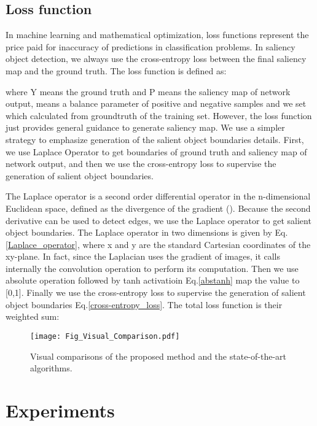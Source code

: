 \documentclass[10pt,twocolumn,letterpaper]{article}
\begin{document}
\subsection{Loss function}\label{sec:Loss function}
In machine learning and mathematical optimization, loss functions represent the price paid for inaccuracy of predictions in classification problems. In saliency object detection, we always use the cross-entropy loss between the final saliency map and the ground truth. The loss function is defined as:

where Y means the ground truth and P means the saliency map of network output,  means a balance parameter of positive and negative samples and we set  which calculated from groundtruth of the training set. However, the loss function just provides general guidance to generate saliency map. We use a simpler strategy to emphasize generation of the salient object boundaries details. First, we use Laplace Operator\cite{LO} to get boundaries of ground truth and saliency map of network output, and then we use the cross-entropy loss to supervise the generation of salient object boundaries.

 




The Laplace operator is a second order differential operator in the n-dimensional Euclidean space, defined as the divergence of the gradient (). Because the second derivative can be used to detect edges, we use the Laplace operator to get salient object boundaries. The Laplace operator in two dimensions is given by Eq.\ref{Laplace_operator}, where x and y are the standard Cartesian coordinates of the xy-plane. In fact, since the Laplacian uses the gradient of images, it calls internally the convolution operation to perform its computation. Then we use absolute operation followed by tanh activatioin Eq.\ref{abstanh} map the value to [0,1]. Finally we use the cross-entropy loss to supervise the generation of salient object boundaries Eq.\ref{cross-entropy_loss}. The total loss function is their weighted sum:


\begin{figure*}[t]
\centering
\texttt{[image: Fig\_Visual\_Comparison.pdf]}
\caption{ Visual comparisons of the proposed method and the state-of-the-art algorithms.}
\label{fig:Visual_Comparison}
\end{figure*}


\section{Experiments}
\end{document}
